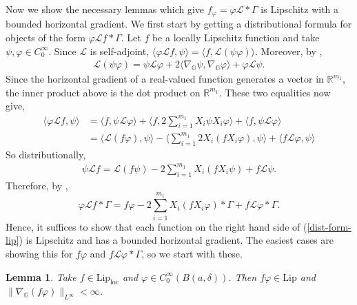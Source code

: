 \documentclass[12pt,a4paper,reqno]{amsart}
\newcommand{\cg}{\Gamma}
\renewcommand{\L}{\mathcal{L}}
\newcommand{\R}{\mathbb{R}}
\newcommand{\G}{\mathbb{G}}
\numberwithin{equation}{section}
\newtheorem{lem}[thm]{Lemma}
\theoremstyle{definition}
\begin{document}
Now we show the necessary lemmas which give $f_{\varphi} = \varphi \L \ast \cg$ is Lipschitz with a bounded horizontal gradient. We first start by getting a distributional formula for objects of the form $\varphi \L f \ast \cg$. Let $f$ be a locally Lipschitz function and take $\psi, \varphi \in C_0^{\infty}$. Since $\L$ is self-adjoint, $\langle \varphi \L f, \psi \rangle = \langle f, \L(\psi  \varphi)\rangle$. Moreover, by \cite[Exercise 6 of Chapter 1]{BLU}, \begin{align*}
\L (\psi \varphi) = \psi \L \varphi + 2\langle \nabla_{\G} \psi, \nabla_{\G} \varphi\rangle + \varphi \L \psi.    
\end{align*}
Since the horizontal gradient of a real-valued function generates a vector in $\R^{m_1}$, the inner product above is the dot product on $\R^{m_1}$.
These two equalities now give,
\begin{align*}
    \langle \varphi \L f, \psi \rangle &= \langle f , \psi \L \varphi \rangle + \langle f, 2\sum_{i=1}^{m_1} X_i \psi X_i \varphi\rangle + \langle f, \psi \L \varphi\rangle \\ &= \langle \L(f \varphi), \psi \rangle - \langle \sum_{i=1}^{m_1} 2 X_i(f X_i \varphi), \psi\rangle+ \langle f \L \varphi, \psi\rangle
\end{align*}
So distributionally, \begin{align*}
 \psi \L f  = \L(f \psi) - 2\sum_{i=1}^{m_1} X_i(fX_i \psi) + f\L \psi.   
\end{align*}
Therefore, by \cite[Corollary 2.8]{Fo},
\begin{equation}\label{dist-form-lip}
\varphi \L f \ast \cg = f \varphi -2 \sum_{i=1}^{m_1} X_i(f X_i \varphi )\ast \cg + f \L \varphi \ast \cg. 
\end{equation}
Hence, it suffices to show that each function on the right hand side of (\ref{dist-form-lip}) is Lipschitz and has a bounded horizontal gradient. The easiest cases are showing this for $f \varphi$ and $f \L \varphi \ast \cg$, so we start with these.
\begin{lem}\label{first_func_is_lip}
Take $f \in \text{Lip}_{\text{loc}}$ and $\varphi \in C_0^{\infty}(B(a,\delta))$. Then $f\varphi \in \text{Lip}$ and $\| \nabla_{\G} (f\varphi)\|_{L^{\infty}} < \infty$.    
\end{lem}
\end{document}
